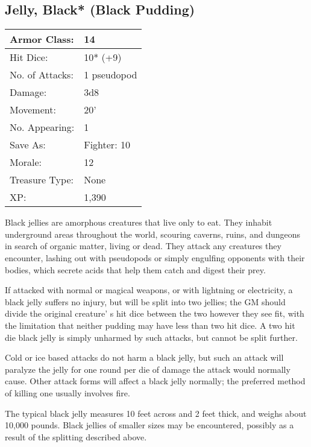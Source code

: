\documentclass[a4paper,twoside,openany,10pt]{book}
\begin{document}
\begin{multicols}{2}
\subsection*{Jelly, Black* (Black Pudding)}\label{jelly-black-black-pudding}

\begin{tabularx}{0.50\textwidth}{@{}lX@{}}
Armor Class: & 14 \\\hline
Hit Dice: & 10* (+9) \\\hline
No. of Attacks: & 1 pseudopod \\\hline
Damage: & 3d8 \\\hline
Movement: & 20' \\\hline
No. Appearing: & 1 \\\hline
Save As: & Fighter: 10 \\\hline
Morale: & 12 \\\hline
Treasure Type: & None \\\hline
XP: & 1,390 \\\hline
\end{tabularx}\medskip

Black jellies are amorphous creatures that live only to eat. They inhabit underground areas throughout the world, scouring caverns, ruins, and dungeons in search of organic matter, living or dead. They attack any creatures they encounter, lashing out with pseudopods or simply engulfing opponents with their bodies, which secrete acids that help them catch and digest their prey.

If attacked with normal or magical weapons, or with lightning or electricity, a black jelly suffers no injury, but will be split into two jellies; the GM should divide the original creature' s hit dice between the two however they see fit, with the limitation that neither pudding may have less than two hit dice. A two hit die black jelly is simply unharmed by such attacks, but cannot be split further.

Cold or ice based attacks do not harm a black jelly, but such an attack will paralyze the jelly for one round per die of damage the attack would normally cause. Other attack forms will affect a black jelly normally; the preferred method of killing one usually involves fire. 

The typical black jelly measures 10 feet across and 2 feet thick, and weighs about 10,000 pounds. Black jellies of smaller sizes may be encountered, possibly as a result of the splitting described above. 


\end{multicols}
\end{document}
